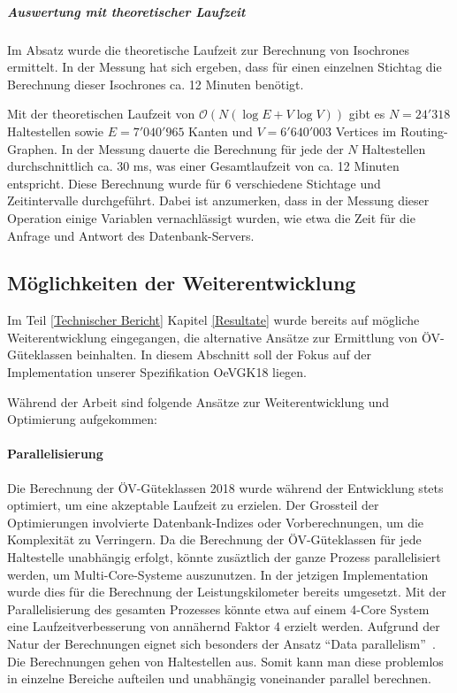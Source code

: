 \subparagraph{Auswertung mit theoretischer Laufzeit}
Im Absatz  wurde die theoretische Laufzeit zur Berechnung von \glspl{Isochrone} ermittelt.
In der Messung hat sich ergeben, dass für einen einzelnen Stichtag die Berechnung dieser \glspl{Isochrone} ca. 12 Minuten benötigt.

Mit der theoretischen Laufzeit von $\mathcal{O}(N (\log E + V \log V))$ gibt es $N = 24'318$ Haltestellen sowie $E = 7'040'965$ Kanten und $V = 6'640'003$ Vertices im Routing-Graphen.
In der Messung dauerte die Berechnung für jede der $N$ Haltestellen durchschnittlich ca. 30 ms, was einer Gesamtlaufzeit von ca. 12 Minuten entspricht.
Diese Berechnung wurde für 6 verschiedene Stichtage und Zeitintervalle durchgeführt.
Dabei ist anzumerken, dass in der Messung dieser Operation einige Variablen vernachlässigt wurden, wie etwa die Zeit für die Anfrage und Antwort des Datenbank-Servers.

\subsection{Möglichkeiten der Weiterentwicklung}
\label{Resultate und Weiterentwicklung:Möglichkeiten der Weiterentwicklung}

Im Teil \ref{Technischer Bericht} Kapitel \ref{Resultate} wurde bereits auf mögliche Weiterentwicklung eingegangen, die alternative Ansätze zur Ermittlung von \acs{ÖV}-Güteklassen beinhalten.
In diesem Abschnitt soll der Fokus auf der Implementation unserer Spezifikation \gls{OeVGK18} liegen.

Während der Arbeit sind folgende Ansätze zur Weiterentwicklung und Optimierung aufgekommen:

\paragraph{Parallelisierung}
Die Berechnung der \acs{ÖV}-Güteklassen 2018 wurde während der Entwicklung stets optimiert, um eine akzeptable Laufzeit zu erzielen.
Der Grossteil der Optimierungen involvierte Datenbank-Indizes oder Vorberechnungen, um die Komplexität zu Verringern.
Da die Berechnung der \acs{ÖV}-Güteklassen für jede Haltestelle unabhängig erfolgt, könnte zusäztlich der ganze Prozess parallelisiert werden, um Multi-Core-Systeme auszunutzen.
In der jetzigen Implementation wurde dies für die Berechnung der Leistungskilometer bereits umgesetzt.
Mit der Parallelisierung des gesamten Prozesses könnte etwa auf einem 4-Core System eine Laufzeitverbesserung von annähernd Faktor 4 erzielt werden.
Aufgrund der Natur der Berechnungen eignet sich besonders der Ansatz "`Data parallelism"'~\cite{parallel_comp}.
Die Berechnungen gehen von Haltestellen aus.
Somit kann man diese problemlos in einzelne Bereiche aufteilen und unabhängig voneinander parallel berechnen.

